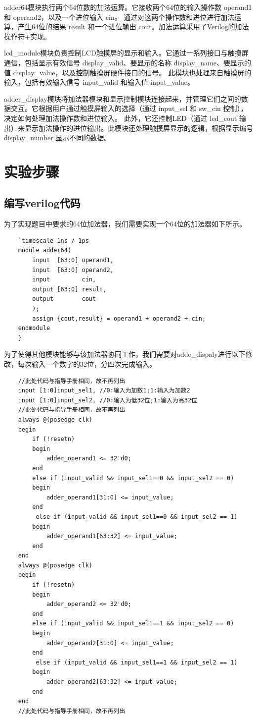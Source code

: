 \documentclass{ctexart}
\begin{document}
adder64模块执行两个64位数的加法运算。它接收两个64位的输入操作数 operand1 和 operand2，以及一个进位输入 cin。
通过对这两个操作数和进位进行加法运算，产生64位的结果 result 和一个进位输出 cout。加法运算采用了Verilog的加法操作符+实现。

lcd\_module模块负责控制LCD触摸屏的显示和输入。它通过一系列接口与触摸屏通信，包括显示有效信号 display\_valid、要显示的名称 display\_name、要显示的值 display\_value，以及控制触摸屏硬件接口的信号。
此模块也处理来自触摸屏的输入，包括有效输入信号 input\_valid 和输入值 input\_value。

adder\_display模块将加法器模块和显示控制模块连接起来，并管理它们之间的数据交互。它根据用户通过触摸屏输入的选择（通过 input\_sel 和 sw\_cin 控制），决定如何处理加法操作数和进位输入。
此外，它还控制LED（通过 led\_cout 输出）来显示加法操作的进位输出。此模块还处理触摸屏显示的逻辑，根据显示编号 display\_number 显示不同的数据。
\section{实验步骤}
\subsection{编写verilog代码}
为了实现题目中要求的64位加法器，我们需要实现一个64位的加法器如下所示。
\begin{verbatim}
    `timescale 1ns / 1ps
    module adder64(
        input  [63:0] operand1,
        input  [63:0] operand2,
        input         cin,
        output [63:0] result,
        output        cout
        );
        assign {cout,result} = operand1 + operand2 + cin;
    endmodule
    }
\end{verbatim}
为了使得其他模块能够与该加法器协同工作，我们需要对adde\_dispaly进行以下修改，每次输入一个数字的32位，分四次完成输入。
\begin{verbatim}
    //此处代码与指导手册相同，故不再列出
    input [1:0]input_sel1, //0:输入为加数1;1:输入为加数2
    input [1:0]input_sel2, //0:输入为低32位;1:输入为高32位
    //此处代码与指导手册相同，故不再列出
    always @(posedge clk)
    begin
        if (!resetn)
        begin
            adder_operand1 <= 32'd0;
        end
        else if (input_valid && input_sel1==0 && input_sel2 == 0)
        begin
            adder_operand1[31:0] <= input_value;
        end
         else if (input_valid && input_sel1==0 && input_sel2 == 1)
        begin
            adder_operand1[63:32] <= input_value;
        end
    end
    always @(posedge clk)
    begin
        if (!resetn)
        begin
            adder_operand2 <= 32'd0;
        end
        else if (input_valid && input_sel1==1 && input_sel2 == 0)
        begin
            adder_operand2[31:0] <= input_value;
        end
         else if (input_valid && input_sel1==1 && input_sel2 == 1)
        begin
            adder_operand2[63:32] <= input_value;
        end
    end
    //此处代码与指导手册相同，故不再列出
\end{verbatim}
\end{document}
